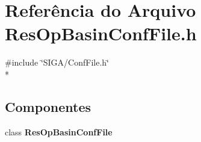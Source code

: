 \section{Referência do Arquivo Res\+Op\+Basin\+Conf\+File.\+h}
\label{_res_op_basin_conf_file_8h}
{\ttfamily \#include \char`\"{}S\+I\+G\+A/\+Conf\+File.\+h\char`\"{}}\\*
\subsection*{Componentes}
\begin{DoxyCompactItemize}
\item 
class {\bf Res\+Op\+Basin\+Conf\+File}
\end{DoxyCompactItemize}
